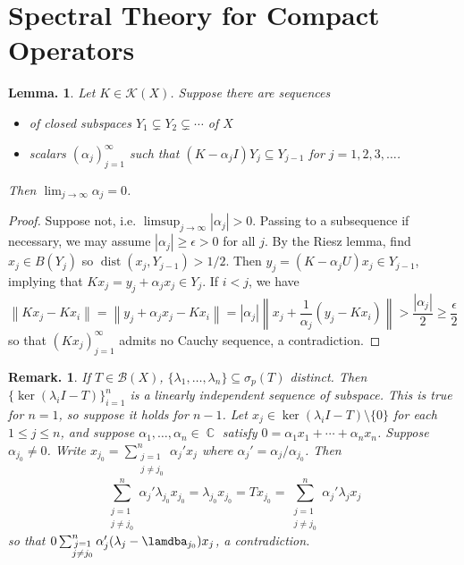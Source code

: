 \documentclass[11pt, a4paper]{memoir}
\DeclareMathOperator{\C}{{\mathbb{C}}}
\newcommand{\norm}[1]{\ensuremath{\left\lVert#1\right\rVert}}
\theoremstyle{change}
\newtheorem{lemma}[theorem]{Lemma.}
\theoremstyle{plain}
\theoremstyle{nonumberplain}
\newtheorem{remark}{Remark.}
\newtheorem{proof}{Proof}
\DeclareMathOperator{\dist}{dist}
\numberwithin{equation}{section}
\begin{document}
\section{Spectral Theory for Compact Operators}
\begin{lemma}
    Let $K\in\mathcal{K}(X)$.
    Suppose there are sequences
    \begin{itemize}[nl]
        \item of closed subspaces $Y_1\subsetneq Y_2\subsetneq\cdots$ of $X$
        \item scalars $(\alpha_j)_{j=1}^\infty$ such that $(K-\alpha_jI)Y_j\subseteq Y_{j-1}$ for $j=1,2,3,\ldots$.
    \end{itemize}
    Then $\lim_{j\to\infty}\alpha_j=0$.
\end{lemma}
\begin{proof}
    Suppose not, i.e. $\limsup_{j\to\infty}|\alpha_j|>0$.
    Passing to a subsequence if necessary, we may assume $|\alpha_j|\geq\epsilon>0$ for all $j$.
    By the Riesz lemma, find $x_j\in B(Y_j)$ so $\dist(x_j,Y_{j-1})>1/2$.
    Then $y_j=(K-\alpha_jU)x_j\in Y_{j-1}$, implying that $Kx_j=y_j+\alpha_jx_j\in Y_j$.
    If $i<j$, we have
    \begin{equation*}
        \norm{Kx_j-Kx_i}=\norm{y_j+\alpha_jx_j-Kx_i}=|\alpha_j|\norm{x_j+\frac{1}{\alpha_j}(y_j-Kx_i)}>\frac{|\alpha_j|}{2}\geq\frac{\epsilon}{2}
    \end{equation*}
    so that $(Kx_j)_{j=1}^\infty$ admits no Cauchy sequence, a contradiction.
\end{proof}
\begin{remark}
    If $T\in\mathcal{B}(X)$, $\{\lambda_1,\ldots,\lambda_n\}\subseteq\sigma_p(T)$ distinct.
    Then $\{\ker(\lambda_iI-T)\}_{i=1}^n$ is a linearly independent sequence of subspace.
    This is true for $n=1$, so suppose it holds for $n-1$.
    Let $x_j\in\ker(\lambda_iI-T)\setminus\{0\}$ for each $1\leq j\leq n$, and suppose $\alpha_1,\ldots,\alpha_n\in\C$ satisfy $0=\alpha_1x_1+\cdots+\alpha_nx_n$.
    Suppose $\alpha_{j_0}\neq 0$.
    Write $x_{j_0}=\sum_{\substack{j=1\\j\neq j_0}}^n\alpha_j'x_j$ where $\alpha_j'=\alpha_j/\alpha_{j_0}$.
    Then
    \begin{equation*}
        \sum_{\substack{j=1\\j\neq j_0}}^n\alpha_j'\lambda_{j_0}x_{j_0}=\lambda_{j_0}x_{j_0}=Tx_{j_0}=\sum_{\substack{j=1\\j\neq j_0}}^n\alpha_j'\lambda_j x_j
    \end{equation*}
    so that $0\sum_{\substack{j=1\\j\neq j_0}}^n\alpha_j'(\lambda_j-\lamdba_{j_0})x_j$, a contradiction.
\end{remark}
\end{document}
